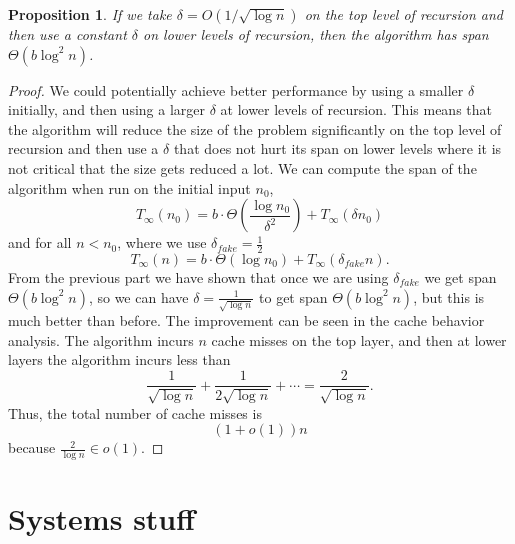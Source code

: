 \documentclass[twocolumn, twoside, 12pt]{article}
\newtheorem{proposition}{Proposition}
\begin{document}
\begin{proposition}
	If we take $\delta = O(1 / \sqrt{\log n})$ on the top level of recursion and then use a constant $\delta$ on lower levels of recursion, then the algorithm has span $\Theta(b\log^2 n)$.
\end{proposition}
\begin{proof}
We could potentially achieve better performance by using a smaller $\delta$ initially, and then using a larger $\delta$ at lower levels of recursion.
This means that the algorithm will reduce the size of the problem significantly on the top level of recursion and then use a $\delta$ that does not hurt its span on lower levels where it is not critical that the size gets reduced a lot.
We can compute the span of the algorithm when run on the initial input $n_0$,
$$T_\infty(n_0) = b\cdot \Theta(\frac{\log n_0}{\delta ^2})+T_\infty(\delta n_0)$$
and for all $n<n_0$, where we use $\delta_{fake} = \frac{1}{2}$
$$T_\infty(n) =  b\cdot \Theta(\log n_0)+T_\infty(\delta_{fake} n).$$
From the previous part we have shown that once we are using $\delta_{fake}$ we get span $\Theta(b\log^2 n)$, so we can have $\delta = \frac{1}{\sqrt{\log n}}$ to get span $\Theta(b\log^2 n)$, but this is much better than before. 
The improvement can be seen in the cache behavior analysis.
The algorithm incurs $n$ cache misses on the top layer, and then at lower layers the algorithm incurs less than
	$$\frac{1}{\sqrt{\log n}} + \frac{1}{2\sqrt{\log n}} + \cdots = \frac{2}{\sqrt{\log n}}.$$
	Thus, the total number of cache misses is $$(1+o(1))n$$ because $\frac{2}{\log n} \in o(1)$.

\end{proof}
	
	
\section{Systems stuff}
\end{document}
